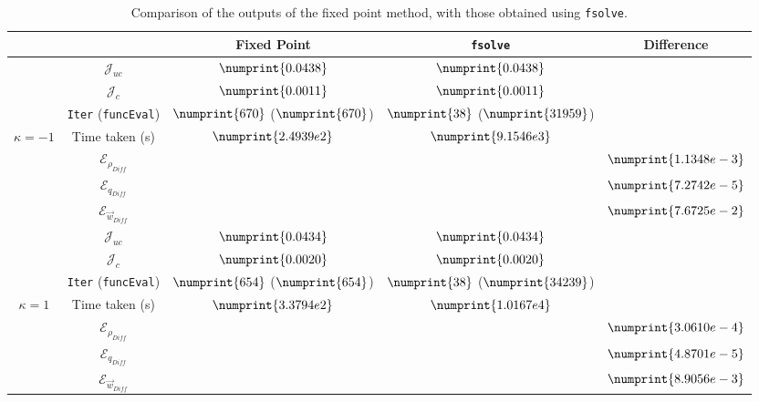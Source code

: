 \documentclass[11pt, a4paper]{article}
\theoremstyle{definition}
\newcommand{\adj}{q}
\begin{document}
\begin{table}
	\centering
	\begin{tabular}{ | c | c || c | c | c ||}
		\hline
		\multicolumn{2}{|c||}{} & Fixed Point & \texttt{fsolve} & Difference   \\
		\hline
		\hline
		& $\mathcal{J}_{uc}$ & $\numprint{0.0438}$ & $\numprint{0.0438}$ &   \\
		& $\mathcal{J}_{c}$ & $\numprint{0.0011}$ & $\numprint{0.0011}$ &   \\
		& \texttt{Iter} (\texttt{funcEval}) & $\numprint{670}$ ($\numprint{670}$)  & $\numprint{38}$ ($\numprint{31959}$)  &   \\
		$\kappa =-1$ & Time taken (s) & $\numprint{2.4939e2}$ & $\numprint{9.1546e3}$ &   \\
		& $\mathcal{E}_{\rho_{Diff}}$ & & &$\numprint{1.1348e-3}$  \\
		& $\mathcal{E}_{\adj_{Diff}}$ & & &$\numprint{7.2742e-5}$  \\
		& $\mathcal{E}_{\vec{w}_{Diff}}$ & & & $\numprint{7.6725e-2}$  \\
		\hline
		& $\mathcal{J}_{uc}$ & $\numprint{0.0434}$ & $\numprint{0.0434}$ &   \\
		& $\mathcal{J}_{c}$ & $\numprint{0.0020}$ & $\numprint{0.0020}$ &   \\
		& \texttt{Iter} (\texttt{funcEval}) & $\numprint{654}$ ($\numprint{654}$)  & $\numprint{38}$ ($\numprint{34239}$)  &   \\
		$\kappa =1$ & Time taken (s) & $\numprint{3.3794e2}$ & $\numprint{1.0167e4}$ &   \\
		& $\mathcal{E}_{\rho_{Diff}}$ & & &$\numprint{3.0610e-4}$  \\
		& $\mathcal{E}_{\adj_{Diff}}$ & & &$\numprint{4.8701e-5}$  \\
		& $\mathcal{E}_{\vec{w}_{Diff}}$ & & & $\numprint{8.9056e-3}$  \\
		\hline
	\end{tabular}
	\caption{Comparison of the outputs of the fixed point method, with those obtained using \texttt{fsolve}.}
	\label{TabA3:Prodb1}
\end{table}
\end{document}
